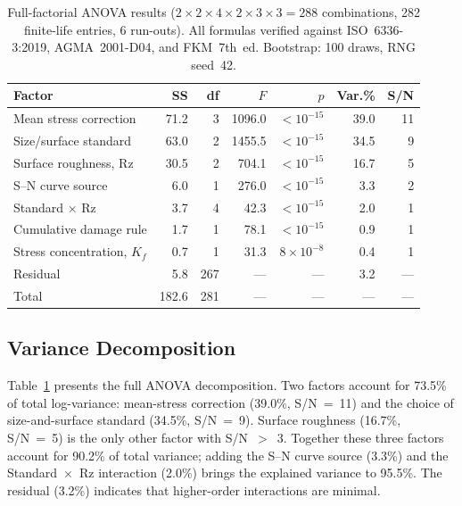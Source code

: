 \documentclass[12pt,a4paper]{article}
\begin{document}
\begin{table}[h]
\centering
\caption{Full-factorial ANOVA results ($2\times2\times4\times2\times3\times3 =
288$ combinations, 282 finite-life entries, 6 run-outs).
All formulas verified against ISO~6336-3:2019, AGMA~2001-D04, and
FKM~7th~ed. Bootstrap: 100 draws, RNG seed~42.}
\label{tab:anova}
\begin{tabular}{lrrrrrr}
\toprule
Factor & SS & df & $F$ & $p$ & Var.\% & S/N \\
\midrule
Mean stress correction & 71.2 & 3 & 1096.0 & $<10^{-15}$ & 39.0 & 11 \\
Size/surface standard & 63.0 & 2 & 1455.5 & $<10^{-15}$ & 34.5 & 9 \\
Surface roughness, Rz & 30.5 & 2 & 704.1 & $<10^{-15}$ & 16.7 & 5 \\
S--N curve source & 6.0 & 1 & 276.0 & $<10^{-15}$ & 3.3 & 2 \\
Standard $\times$ Rz & 3.7 & 4 & 42.3 & $<10^{-15}$ & 2.0 & 1 \\
Cumulative damage rule & 1.7 & 1 & 78.1 & $<10^{-15}$ & 0.9 & 1 \\
Stress concentration, $K_f$ & 0.7 & 1 & 31.3 & $8\times10^{-8}$ & 0.4 & 1 \\
\midrule
Residual & 5.8 & 267 & --- & --- & 3.2 & --- \\
Total & 182.6 & 281 & --- & --- & --- & --- \\
\bottomrule
\end{tabular}
\end{table}

\subsection{Variance Decomposition}

Table~\ref{tab:anova} presents the full ANOVA decomposition. Two factors
account for 73.5\% of total log-variance: mean-stress correction (39.0\%,
S/N~=~11) and the choice of size-and-surface standard (34.5\%, S/N~=~9).
Surface roughness (16.7\%, S/N~=~5) is the only other factor with
S/N~$>$~3. Together these three factors account for 90.2\% of total
variance; adding the S--N curve source (3.3\%) and the
Standard~$\times$~Rz interaction (2.0\%) brings the explained variance
to 95.5\%. The residual (3.2\%) indicates that higher-order interactions
are minimal.
\end{document}
